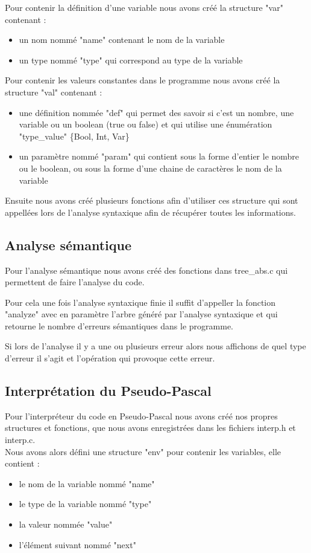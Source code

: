 \documentclass{report}
\begin{document}
Pour contenir la définition d'une variable nous avons créé la structure "var" contenant :
\begin{itemize}
\item un nom nommé "name" contenant le nom de la variable
\item un type nommé "type" qui correspond au type de la variable
\end{itemize}
\bigskip

Pour contenir les valeurs constantes dans le programme nous avons créé la structure "val" contenant :
\begin{itemize}
\item une définition nommée "def" qui permet des savoir si c'est un nombre, une variable ou un boolean (true ou false) et qui utilise une énumération "type\_value" \{Bool, Int, Var\}
\item un paramètre nommé "param" qui contient sous la forme d'entier le nombre ou le boolean, ou sous la forme d'une chaine de caractères le nom de la variable
\end{itemize}
\bigskip

Ensuite nous avons créé plusieurs fonctions afin d'utiliser ces structure qui sont appellées lors de l'analyse syntaxique afin de récupérer toutes les informations. 

\subsection{Analyse sémantique}
Pour l'analyse sémantique nous avons créé des fonctions dans tree\_abs.c qui permettent de faire l'analyse du code.

Pour cela une fois l'analyse syntaxique finie il suffit d'appeller la fonction "analyze" avec en paramètre l'arbre généré par l'analyse syntaxique et qui retourne le nombre d'erreurs sémantiques dans le programme.

Si lors de l'analyse il y a une ou plusieurs erreur alors nous affichons de quel type d'erreur il s'agit et l'opération qui provoque cette erreur.

\subsection{Interprétation du Pseudo-Pascal}
Pour l'interpréteur du code en Pseudo-Pascal nous avons créé nos propres structures et fonctions, que nous avons enregistrées dans les fichiers interp.h et interp.c.\\

Nous avons alors défini une structure "env" pour contenir les variables, elle contient :
\begin{itemize}
\item le nom de la variable nommé "name"
\item le type de la variable nommé "type"
\item la valeur nommée "value"
\item l'élément suivant nommé "next"
\end{itemize}
\bigskip
\end{document}
